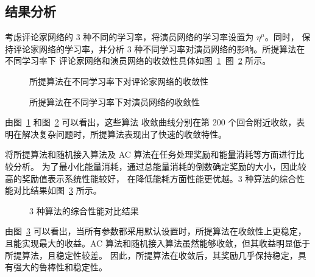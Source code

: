 \subsection{结果分析}

考虑评论家网络的 3 种不同的学习率，将演员网络的学习率设置为 $\eta^{\mu}$。同时，
保持评论家网络的学习率，并分析 3 种不同学习率对演员网络的影响。所提算法在不同学习率下
评论家网络和演员网络的收敛性具体如图~\ref{fig:convergence-critic}~图~\ref{fig:convergence-actor}
所示。

\begin{figure}[H]
  \centering
  \caption{所提算法在不同学习率下对评论家网络的收敛性}
  \label{fig:convergence-critic}
\end{figure}

\begin{figure}[H]
  \centering
  \caption{所提算法在不同学习率下对演员网络的收敛性}
  \label{fig:convergence-actor}
\end{figure}

由图~\ref{fig:convergence-critic} 和图~\ref{fig:convergence-actor} 可以看出，这些算法
收敛曲线分别在第 200 个回合附近收敛，表明在解决复杂问题时，所提算法表现出了快速的收敛特性。

将所提算法和随机接入算法及 AC 算法在任务处理奖励和能量消耗等方面进行比较分析。
为了最小化能量消耗，通过总能量消耗的倒数确定奖励的大小，因此较高的奖励值表示系统性能较好，
在降低能耗方面性能更优越。3 种算法的综合性能对比结果如图~\ref{fig:comparison} 所示。

\begin{figure}[H]
  \centering
  \caption{3 种算法的综合性能对比结果}
  \label{fig:comparison}
\end{figure}

由图~\ref{fig:comparison} 可以看出，当所有参数都采用默认设置时，所提算法在收敛性上更稳定，
且能实现最大的收益。AC 算法和随机接入算法虽然能够收敛，但其收益明显低于所提算法，且稳定性较差。
因此，所提算法在收敛后，其奖励几乎保持稳定，具有强大的鲁棒性和稳定性。
